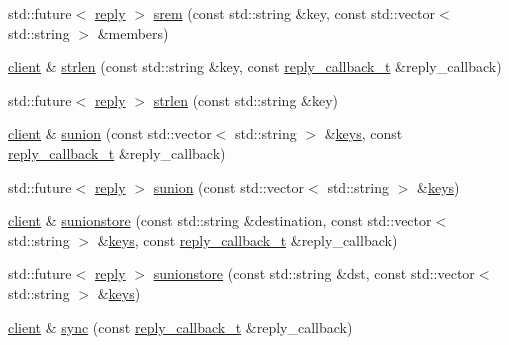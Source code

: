 \begin{DoxyCompactItemize}
\item 
std\+::future$<$ \hyperlink{classcpp__redis_1_1reply}{reply} $>$ \hyperlink{classcpp__redis_1_1client_a542bc98a1968e22dfce3cd7051680b6f}{srem} (const std\+::string \&key, const std\+::vector$<$ std\+::string $>$ \&members)
\item 
\hyperlink{classcpp__redis_1_1client}{client} \& \hyperlink{classcpp__redis_1_1client_ab7dab44434cee5e29e2bdf3c3be1df94}{strlen} (const std\+::string \&key, const \hyperlink{classcpp__redis_1_1client_a061a1140d36d2eaeda82b09a0bb3f9f2}{reply\+\_\+callback\+\_\+t} \&reply\+\_\+callback)
\item 
std\+::future$<$ \hyperlink{classcpp__redis_1_1reply}{reply} $>$ \hyperlink{classcpp__redis_1_1client_a6b9f2a3a8952de874a9a6e1555c85195}{strlen} (const std\+::string \&key)
\item 
\hyperlink{classcpp__redis_1_1client}{client} \& \hyperlink{classcpp__redis_1_1client_a7128cdf97d9f768b117bab5843059fe1}{sunion} (const std\+::vector$<$ std\+::string $>$ \&\hyperlink{classcpp__redis_1_1client_acb7845a206b2321e6919c2f38282c322}{keys}, const \hyperlink{classcpp__redis_1_1client_a061a1140d36d2eaeda82b09a0bb3f9f2}{reply\+\_\+callback\+\_\+t} \&reply\+\_\+callback)
\item 
std\+::future$<$ \hyperlink{classcpp__redis_1_1reply}{reply} $>$ \hyperlink{classcpp__redis_1_1client_a7f76d091899206932d250edf3f990e94}{sunion} (const std\+::vector$<$ std\+::string $>$ \&\hyperlink{classcpp__redis_1_1client_acb7845a206b2321e6919c2f38282c322}{keys})
\item 
\hyperlink{classcpp__redis_1_1client}{client} \& \hyperlink{classcpp__redis_1_1client_a26f38c6a8b7f03cd6ec9d5e4d121be32}{sunionstore} (const std\+::string \&destination, const std\+::vector$<$ std\+::string $>$ \&\hyperlink{classcpp__redis_1_1client_acb7845a206b2321e6919c2f38282c322}{keys}, const \hyperlink{classcpp__redis_1_1client_a061a1140d36d2eaeda82b09a0bb3f9f2}{reply\+\_\+callback\+\_\+t} \&reply\+\_\+callback)
\item 
std\+::future$<$ \hyperlink{classcpp__redis_1_1reply}{reply} $>$ \hyperlink{classcpp__redis_1_1client_af71da68029a24b52a5005a24c859893d}{sunionstore} (const std\+::string \&dst, const std\+::vector$<$ std\+::string $>$ \&\hyperlink{classcpp__redis_1_1client_acb7845a206b2321e6919c2f38282c322}{keys})
\item 
\hyperlink{classcpp__redis_1_1client}{client} \& \hyperlink{classcpp__redis_1_1client_a47d8402e7fa9f7b8a021356baf83fd1f}{sync} (const \hyperlink{classcpp__redis_1_1client_a061a1140d36d2eaeda82b09a0bb3f9f2}{reply\+\_\+callback\+\_\+t} \&reply\+\_\+callback)

\end{DoxyCompactItemize}
